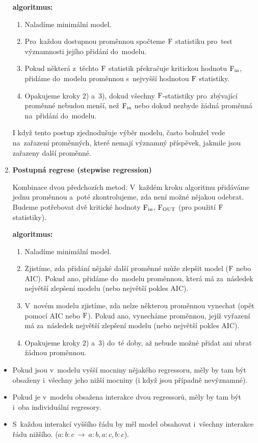\begin{enumerate}[1)]
\textbf{algoritmus:}\begin{enumerate}[	1)]
	\item Naladíme minimální model.
	\item Pro~každou dostupnou proměnnou spočteme $\mathrm{F}$ statistiku pro~test významnosti jejího přidání do~modelu.
	\item Pokud některá z~těchto $\mathrm{F}$ statistik překračuje kritickou hodnotu $\mathrm{F}_\mathrm{in}$, přidáme do~modelu proměnnou s~nejvyšší hodnotou $\mathrm{F}$ statistiky.
	\item Opakujeme kroky 2) a~3), dokud všechny $\mathrm{F}$-statistiky pro~zbývající proměnné nebudou menší, než $\mathrm{F}_\mathrm{in}$ nebo dokud nezbyde žádná proměnná na~přidání do~modelu.
\end{enumerate}
\begin{remark}
	I když tento postup zjednodušuje výběr modelu, často bohužel vede na~zařazení proměnných, které nemají významný příspěvek, jakmile jsou zařazeny další proměnné.
\end{remark}

\item
\textbf{Postupná regrese (stepwise regression)}

Kombinace dvou předchozích metod. V~každém kroku algoritmu přidáváme jednu proměnnou a~poté zkontrolujeme, zda není možné nějakou odebrat. Budeme potřebovat  dvě kritické hodnoty $\mathrm{F}_\mathrm{in}$, $\mathrm{F}_\mathrm{OUT}$ (pro použití $\mathrm{F}$ statistiky).

\textbf{algoritmus:}\begin{enumerate}[	1)]
	\item Naladíme minimální model.
	\item Zjistíme, zda přidání nějaké další proměnné může zlepšit model ($\mathrm{F}$ nebo AIC). Pokud ano, přidáme do~modelu proměnnou, která má za~následek největší zlepšení modelu (nebo největší pokles AIC).
	\item V~novém modelu zjistíme, zda nelze některou proměnnou vynechat (opět pomocí AIC nebo $\mathrm{F}$). Pokud ano, vynecháme proměnnou, jejíž vyřazení má za~následek největší zlepšení modelu (nebo největší pokles AIC).
	\item Opakujeme kroky 2) a~3) do~té doby, až nebude možné přidat ani ubrat žádnou proměnnou.
\end{enumerate}
\end{enumerate}

\begin{remark}
	\begin{itemize}
		\item Pokud jsou v~modelu vyšší mocniny nějakého regressoru, měly by tam být obsaženy i~všechny jeho nižší mocniny (i když jsou případně nevýznamné).
		\item Pokud je v~modelu obsažena interakce dvou regressorů, měly by tam být i~oba individuální regresory.
		\item S~každou interakcí vyššího řádu by měl model obsahovat i~všechny interakce řádu nižšího. ($a:b:c~\to~a:b,a:c,b:c$).
	\end{itemize}
\end{remark}


